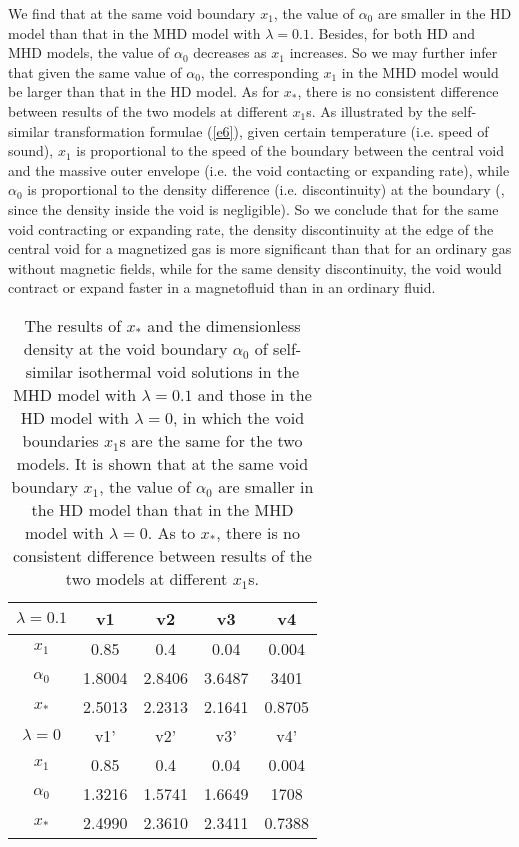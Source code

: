 \documentclass[fleqn,usenatbib]{mnras}
\begin{document}
We find that at the same void boundary $x_{1}$, the value of $\alpha_{0}$ are smaller in the HD model than that in the MHD model with $\lambda=0.1$. Besides, for both HD and MHD models, the value of $\alpha_{0}$ decreases as $x_{1}$ increases. So we may further infer that given the same value of $\alpha_{0}$, the corresponding $x_{1}$ in the MHD model would be larger than that in the HD model. As for $x_{*}$, there is no consistent difference between results of the two models at different $x_{1}$s. As illustrated by the self-similar transformation formulae (\ref{e6}), given certain temperature (i.e. speed of sound), $x_{1}$ is proportional to the speed of the boundary between the central void and the massive outer envelope (i.e. the void contacting or expanding rate), while $\alpha_{0}$ is proportional to the density difference (i.e. discontinuity) at the boundary (, since the density inside the void is negligible). So we conclude that for the same void contracting or expanding rate, the density discontinuity at the edge of the central void for a magnetized gas is more significant than that for an ordinary gas without magnetic fields, while for the same density discontinuity, the void would contract or expand faster in a magnetofluid than in an ordinary fluid. 
\begin{table}
\centering
\caption{The results of $x_{*}$ and the dimensionless density at the void boundary $\alpha_{0}$ of self-similar isothermal void solutions in the MHD model with $\lambda=0.1$ and those in the HD model with $\lambda=0$, in which the void boundaries $x_{1}$s are the same for the two models. It is shown that at the same void boundary $x_{1}$, the value of $\alpha_{0}$ are smaller in the HD model than that in the MHD model with $\lambda=0$. As to $x_{*}$, there is no consistent difference between results of the two models at different $x_{1}$s.}
\begin{tabular}{ccccc}
\hline
$\lambda=0.1$ & v1 & v2 & v3 & v4\\
\hline
$x_{1}$ & 0.85 & 0.4 & 0.04 & 0.004\\
$\alpha_{0}$ & 1.8004 & 2.8406 & 3.6487 & 3401\\
$x_{*}$ & 2.5013 & 2.2313 & 2.1641 & 0.8705\\
\hline
$\lambda=0$ & v1' & v2' & v3' & v4'\\
\hline
$x_{1}$ & 0.85 & 0.4 & 0.04 & 0.004\\
$\alpha_{0}$ & 1.3216 & 1.5741 & 1.6649 & 1708\\
$x_{*}$ & 2.4990 & 2.3610 & 2.3411 & 0.7388\\
\hline
\end{tabular}
\label{t7}
\end{table}
\end{document}

